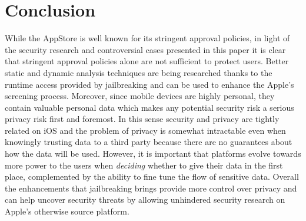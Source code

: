 \documentclass[12pt, titlepage, oneside]{article}
\begin{document}
\section{Conclusion}
While the AppStore is well known for its stringent approval policies, in light of the security research and controversial cases presented in this paper it is clear that stringent approval policies alone are not sufficient to protect users. Better static and dynamic analysis techniques are being researched\cite{dynamic} thanks to the runtime access provided by jailbreaking and can be used to enhance the Apple's screening process. Moreover, since mobile devices are highly personal, they contain valuable personal data which makes any potential security risk a serious privacy risk first and foremost. In this sense security and privacy are tightly related on iOS and the problem of privacy is somewhat intractable even when knowingly trusting data to a third party because there are no guarantees about how the data will be used. However, it is important that platforms evolve towards more power to the users when \emph{deciding} whether to give their data in the first place, complemented by the ability to fine tune the flow of sensitive data. Overall the enhancements that jailbreaking brings provide more control over privacy and can help uncover security threats by allowing unhindered security research on Apple's otherwise source platform.
\pagebreak

\nocite{*} 




\end{document}
